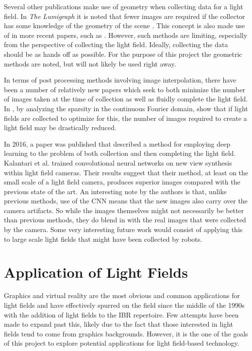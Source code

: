 \documentclass[12pt]{report}
\begin{document}
Several other publications make use of geometry when collecting data for a light field. In \emph{The Lumigraph} it is noted that fewer images are required if the collector has some knowledge of the geometry of the scene \cite{Gortler96}. This concept is also made use of in more recent papers, such as \cite{Kim13}. However, such methods are limiting, especially from the perspective of collecting the light field. Ideally, collecting the data should be as hands off as possible. For the purpose of this project the geometric methods are noted, but will not likely be used right away. 

In terms of post processing methods involving image interpolation, there have been a number of relatively new papers which seek to both minimize the number of images taken at the time of collection as well as fluidly complete the light field. In \cite{Shi14}, by analyzing the sparsity in the continuous Fourier domain, show that if light fields are collected to optimize for this, the number of images required to create a light field may be drastically reduced.

In 2016, a paper was published that described a method for employing deep learning to the problem of both collection and then completing the light field. Kalantari et al. trained convolutional neural networks on new view synthesis within light field cameras. Their results suggest that their method, at least on the small scale of a light field camera, produces superior images compared with the previous state of the art. An interesting note by the authors is that, unlike previous methods, use of the CNN means that the new images also carry over the camera artifacts. So while the images themselves might not necessarily be better than previous methods, they do blend in with the real images that were collected by the camera\cite{Kalantari16}. Some very interesting future work would consist of applying this to large scale light fields that might have been collected by robots.

\section{Application of Light Fields}
Graphics and virtual reality are the most obvious and common applications for light fields and have effectively spurred on the field since the middle of the 1990s with the addition of light fields to the IBR repertoire. Few attempts have been made to expand past this, likely due to the fact that those interested in light fields tend to come from graphics backgrounds. However, it is the one of the goals of this project to explore potential applications for light field-based technology.
\end{document}
